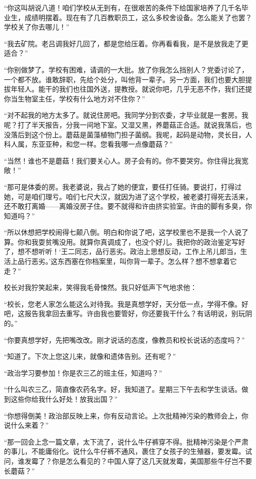  “你这叫胡说八道！咱们学校从无到有，在很艰苦的条件下给国家培养了几千名毕业生，成绩明摆着。现在有了几百教职员工，这么多校舍设备。怎么能关了也罢？学校关了你去哪儿！” 
 
 “我去矿院。老吕调我好几回了，都是您给压着。你再看看我，是不是放我走了更适合？” 
 
 “你别做梦了。学校有困难，请调的一大批。放了你我怎么挡别人？党委讨论了，一个都不放。谁敢辞职，先给个处分，叫他背一辈子。另一方面，我们也要大胆提拔年轻人。能干的我们也往国外送，提教授。就说你吧，几乎无恶不作，我们还提你当生物室主任，学校有什么地方对不住你？” 
 
 “对不起我的地方太多了。就说住房吧。我同学分到农委，才毕业就是一套房。我呢？打了半天报告，分我一间地下室。又湿又黑，养蘑菇正合适。就说我落后，也没落后到这个份上。蘑菇是菌藻植物门担子菌纲。我呢，起码是动物，灵长目，人科人属，东亚亚种，和您一样。您看我哪一点像蘑菇？” 
 
 “当然！谁也不是蘑菇！我们要关心人。房子会有的。你不要哭穷。你住得比我宽敞！” 
 
 “那可是体委的房。我老婆说，我占了她的便宜，要任打任骑。要说打，打得过她，可是咱们理亏。咱们七尺大汉，就因为进了这个学校，被老婆打得死去活来，还不敢打离婚——离婚没房子住。要不就得和许由挤实验室。许由的脚有多臭，你知道吗？” 
 
 “所以休想把学校闹得七颠八倒。明白和你说了吧，这学校里也不是我一个人说了算。你和我耍贫嘴没用。就算你真调成了，也没个好儿。我把你的政治鉴定写好了，想不想听听！‘王二同志，品行恶劣。政治上思想反动，工作上吊儿郎当，生活上品行恶劣。’这东西塞在你档案里，叫你背一辈子。怎么样？想不想拿着它走？” 
 
 校长对我狞笑起来，笑得我毛骨悚然。我只好低声下气地求他： 
 
 “校长，您老人家怎么能这么对待我。我是真想学好，天分低一点，学得不像。好吧，这报告我拿回去重写。许由我也要管好，你还要我干什么？有话明说，别玩阴的。” 
 
 “你要真想学好，先把嘴改改。刚才说话的态度，像教员和校长说话的态度吗？” 
 
 “知道了。下次上您这儿来，就像和遗体告别。还有呢？” 
 
 “政治学习要参加！你是农三乙的班主任，知道吗？” 
 
 “什么叫农三乙，简直像农药名字。好，我知道了。星期三下午去和学生谈话。做到这些你给我什么好处！放我出国？” 
 
 “你想得倒美！政治部反映上来，你有反动言论。上次批精神污染的教师会上，你说什么来着？” 
 
 “那一回会上念一篇文章，太下流了，说什么牛仔裤穿不得。批精神污染是个严肃的事儿，不能庸俗化。说什么牛仔裤不通风，裹住了女孩子的生殖器，要发霉。试问，谁发霉了？你是怎么看见的？中国人穿了这几天就发霉，美国那些牛仔岂不要长蘑菇？” 
 
